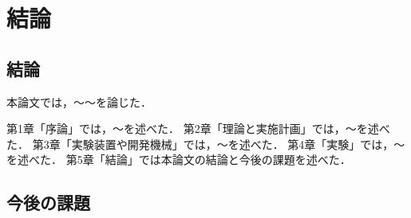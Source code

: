 ﻿%

\chapter{結論}\label{chapter:結論}

\section{結論}

本論文では，～～を論じた．

第1章「序論」では，～を述べた．
第2章「理論と実施計画」では，～を述べた．
第3章「実験装置や開発機械」では，～を述べた．
第4章「実験」では，～を述べた．
第5章「結論」では本論文の結論と今後の課題を述べた．

\section{今後の課題}

